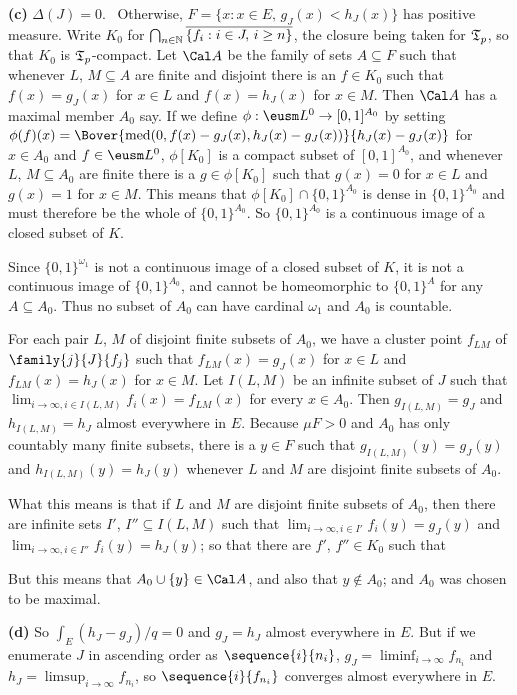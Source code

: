 {{\bf (c)} $\Delta(J)=0$.   \Prf\Quer\ Otherwise,
$F=\{x:x\in E,\,g_J(x)<h_J(x)\}$ has positive measure.   Write $K_0$ for
$\bigcap_{n\in\Bbb N}\overline{\{f_i:i\in J,\,i\ge n\}}$, the
closure being taken for $\frak T_p$, so that $K_0$ is
$\frak T_p$-compact.   Let
$\Cal A$ be the family of sets $A\subseteq F$ such that whenever $L$,
$M\subseteq A$ are finite and disjoint there is an $f\in K_0$ such that
$f(x)=g_J(x)$ for $x\in L$ and $f(x)=h_J(x)$ for $x\in M$.   Then
$\Cal A$ has a maximal member $A_0$ say.   If we define
$\phi:\eusm L^0\to[0,1]^{A_0}$ by setting
$\phi(f)(x)=\Bover{\med(0,f(x)-g_J(x),h_J(x)-g_J(x))}{h_J(x)-g_J(x)}$ for
$x\in A_0$ and $f\in\eusm L^0$,
$\phi[K_0]$ is a compact subset of $[0,1]^{A_0}$, and whenever $L$,
$M\subseteq A_0$ are finite there is a $g\in\phi[K_0]$ such that
$g(x)=0$ for $x\in L$ and $g(x)=1$ for $x\in M$.   This means that
$\phi[K_0]\cap\{0,1\}^{A_0}$ is dense in $\{0,1\}^{A_0}$ and must
therefore be the whole of $\{0,1\}^{A_0}$.   So $\{0,1\}^{A_0}$ is a
continuous image of a closed subset of $K$.

Since $\{0,1\}^{\omega_1}$ is not a continuous image of a closed subset of
$K$, it is not a continuous image of $\{0,1\}^{A_0}$, and cannot be
homeomorphic to $\{0,1\}^A$ for any $A\subseteq A_0$.   Thus no subset of
$A_0$ can have cardinal $\omega_1$ and $A_0$ is countable.

For each pair $L$, $M$ of disjoint finite
subsets of $A_0$, we have a cluster point $f_{LM}$ of
$\family{j}{J}{f_j}$ such that $f_{LM}(x)=g_J(x)$ for $x\in L$ and
$f_{LM}(x)=h_J(x)$ for $x\in M$.   Let $I(L,M)$ be an infinite subset of
$J$ such that
$\lim_{i\to\infty,i\in I(L,M)}f_i(x)=f_{LM}(x)$ for every $x\in A_0$.
Then $g_{I(L,M)}=g_J$ and $h_{I(L,M)}=h_J$ almost everywhere in $E$.
Because $\mu F>0$ and $A_0$ has only countably many finite subsets,
there is a $y\in F$ such that $g_{I(L,M)}(y)=g_J(y)$ and
$h_{I(L,M)}(y)=h_J(y)$ whenever $L$ and $M$ are disjoint finite subsets
of $A_0$.

What this means is that if $L$ and $M$ are disjoint finite subsets of
$A_0$, then there are infinite sets $I'$, $I''\subseteq I(L,M)$ such
that $\lim_{i\to\infty,i\in I'}f_i(y)=g_J(y)$ and
$\lim_{i\to\infty,i\in I''}f_i(y)=h_J(y)$;  so that there are $f'$,
$f''\in K_0$ such that



\noindent But this means that $A_0\cup\{y\}\in\Cal A$, and also that $y\notin A_0$;
and $A_0$ was chosen to be maximal.\ \Bang\Qed

\medskip

{\bf (d)} So $\int_E(h_J-g_J)/q=0$ and $g_J=h_J$ almost everywhere in
$E$.   But if we enumerate $J$ in ascending order as
$\sequence{i}{n_i}$,
$g_J=\liminf_{i\to\infty}f_{n_i}$ and $h_J=\limsup_{i\to\infty}f_{n_i}$,
so $\sequence{i}{f_{n_i}}$ converges almost everywhere in $E$.
}%

